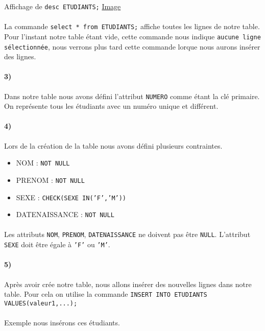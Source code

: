 \documentclass{report}
\begin{document}
Affichage de {\tt desc ETUDIANTS;} \href{run:./Images/TP1/tp1_desc_etudiants.png}{Image}

\paragraph{}La commande {\tt select * from ETUDIANTS;} affiche toutes les lignes de notre table. Pour l'instant notre table étant vide, cette commande nous indique {\tt aucune ligne sélectionnée}, nous verrons plus tard cette commande lorque nous aurons insérer des lignes.

\paragraph{3)}Dans notre table nous avons défini l'attribut {\tt NUMERO} comme étant la clé primaire. On représente tous les étudiants avec un numéro unique et différent.

\paragraph{4)}Lors de la création de la table nous avons défini plusieurs contraintes.
\begin{itemize}
 \item NOM : {\tt NOT NULL}
 \item PRENOM : {\tt NOT NULL}
 \item SEXE : {\tt CHECK(SEXE IN('F','M'))}
 \item DATENAISSANCE : {\tt NOT NULL}
\end{itemize}

\paragraph{}Les attributs {\tt NOM}, {\tt PRENOM}, {\tt DATENAISSANCE} ne doivent pas être {\tt NULL}.
L'attribut {\tt SEXE} doit être égale à {\tt 'F'} ou {\tt 'M'}.

\paragraph{5)}Après avoir crée notre table, nous allons insérer des nouvelles lignes dans notre table. Pour cela on utilise la commande {\tt INSERT INTO ETUDIANTS VALUES(valeur1,...);}

\paragraph{}Exemple nous insérons ces étudiants.
\end{document}
